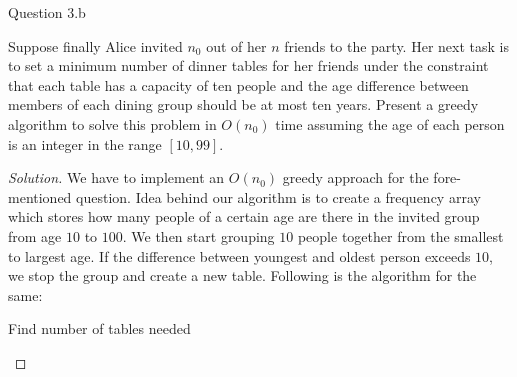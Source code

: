 \begin{solution}{Question 3.b}
    \begin{question}[]
        Suppose finally Alice invited $n_0$ out of her $n$ friends to the party. Her next task is to set a minimum number of dinner tables for her friends under the constraint that each table has a capacity of ten people and the age difference between members of each dining group should be at most ten years. Present a greedy algorithm to solve this problem in $O(n_0)$ time assuming the age of each person is an integer in the range $[10, 99]$.
    \end{question}
    \tcblower{}
    \begin{proof}[Solution]
        We have to implement an $O(n_0)$ greedy approach for the fore-mentioned question. Idea behind our algorithm is to create a frequency array which stores how many people of a certain age are there in the invited group from age $10$ to $100$. We then start grouping $10$ people together from the smallest to largest age. If the difference between youngest and oldest person exceeds $10$, we stop the group and create a new table. Following is the algorithm for the same:
        \begin{algorithm}[H]
            \caption{Find number of tables needed}
            \begin{algorithmic}[1]
                 
                 
                \EndFor{}
                 
                     
                    \EndIf{}
                     
                     

\end{algorithmic}
\end{algorithm}
\end{proof}
\end{solution}
